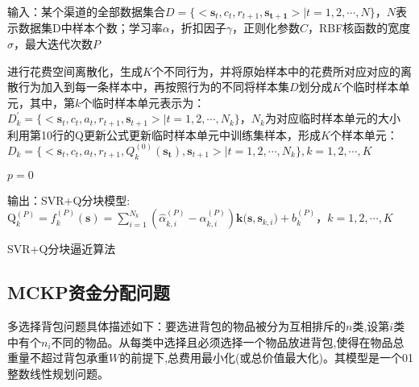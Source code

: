 \begin{algorithm}[htbp]
\small
\SetAlgoLined
{} 
输入：某个渠道的全部数据集合$D=\{<\mathbf{s}_{t},c_{t},r_{t+1},\mathbf{s_{t+1}}>|t=1,2,\cdots,N\}$，$N$表示数据集D中样本个数；学习率$\alpha$，折扣因子$\gamma$，正则化参数$C$，RBF核函数的宽度$\sigma$，最大迭代次数$P$\;

进行花费空间离散化，生成$K$个不同行为，并将原始样本中的花费所对应对应的离散行为加入到每一条样本中，再按照行为的不同将样本集$D$划分成$K$个临时样本单元，其中，第$k$个临时样本单元表示为：$D_{k}^{'}=\{<\mathbf{s}_{t},c_{t},a_{t},r_{t+1},\mathbf{s}_{t+1}>|t=1,2,\cdots,N_{k}\}$，$N_{k}$为对应临时样本单元的大小\;
利用第10行的Q更新公式更新临时样本单元中训练集样本，形成$K$个样本单元：$D_{k}=\{<\mathbf{s}_{t},c_{t},a_{t},r_{t+1},Q_{k}^{(0)}(\mathbf{s_{t}}),\mathbf{s}_{t+1}>|t=1,2,\cdots,N_{k}\}, k=1,2,\cdots,K$\;

$p=0$\;

输出：SVR+Q分块模型:$\text{Q}_{k}^{(P)}=f_{k}^{(P)}(\bm{s})=\sum_{i=1}^{N_{k}}(\hat{\alpha}_{k,i}^{(P)}-\alpha_{k,i}^{(P)})\bm{k(}\bm{s},\bm{s}_{k,i}\bm{)}+b_{k}^{(P)}$，$k=1,2,\cdots,K$\;
\caption{SVR+Q分块逼近算法}
\label{algo:RBF-SVR+Q}
\end{algorithm}

\subsection{MCKP资金分配问题}
多选择背包问题具体描述如下：要选进背包的物品被分为互相排斥的$n$类,设第$i$类中有个$n_{i}$不同的物品。从每类中选择且必须选择一个物品放进背包,使得在物品总重量不超过背包承重$W$的前提下,总费用最小化(或总价值最大化)。其模型是一个01整数线性规划问题。

